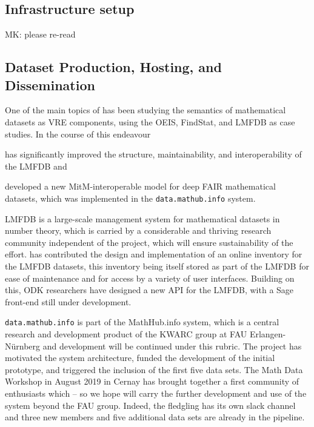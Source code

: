 \documentclass{deliverablereport}
\def\dmh{\texttt{data.mathub.info}\xspace}
\begin{document}
\subsection{Infrastructure setup}


\begin{newpart}{MK: please re-read}
\subsection{Dataset Production, Hosting, and Dissemination}

One of the main topics of  has been studying the semantics of mathematical
datasets as VRE components, using the OEIS, FindStat, and LMFDB as case studies. In the
course of this endeavour \pn
\begin{compactenum}
\item has significantly improved the structure, maintainability, and interoperability of
  the LMFDB and
\item developed a new MitM-interoperable model for deep FAIR mathematical datasets, which
  was implemented in the \dmh system. 
\end{compactenum}
LMFDB is a large-scale management system for mathematical datasets in number theory, which
is carried by a considerable and thriving research community independent of the \pn
project, which will ensure sustainability of the effort.
\pn has contributed the design and implementation of an online inventory for the LMFDB datasets, 
this inventory being itself stored as part of the LMFDB for ease of maintenance and for access by a variety of user interfaces.
Building on this, ODK researchers have designed a new API for the LMFDB, with a Sage front-end still under development.




\dmh is part of the MathHub.info system, which is a central research and development
product of the KWARC group at FAU Erlangen-N\"urnberg and development will be continued
under this rubric.
The \pn project has motivated the system architecture, funded the development of the
initial prototype, and triggered the inclusion of the first five data sets.
The Math Data Workshop in August 2019 in Cernay has brought together a first community of
enthusiasts which -- so we hope will carry the further development and use of the system
beyond the FAU group.
Indeed, the fledgling has its own slack channel and three new members and five additional
data sets are already in the pipeline. 
\end{newpart}
\end{document}
